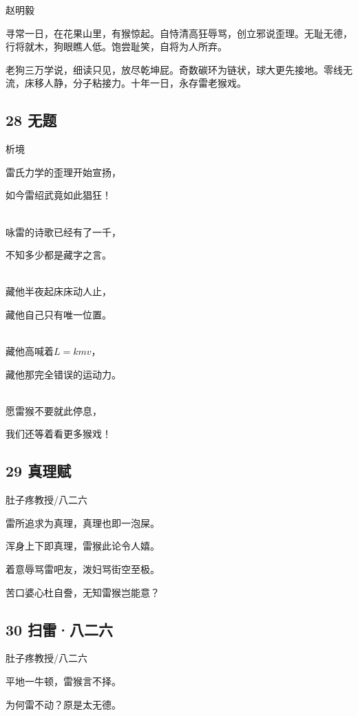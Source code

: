 赵明毅

寻常一日，在花果山里，有猴惊起。自恃清高狂辱骂，创立邪说歪理。无耻无德，行将就木，狗眼瞧人低。饱尝耻笑，自将为人所弃。

老狗三万学说，细读只见，放尽乾坤屁。奇数碳环为链状，球大更先接地。零线无流，床移人静，分子粘接力。十年一日，永存雷老猴戏。

\hypertarget{ux65e0ux9898-6}{%
\subsection{28 无题}\label{ux65e0ux9898-6}}

析境

雷氏力学的歪理开始宣扬，

如今雷绍武竟如此猖狂！

~\\
咏雷的诗歌已经有了一千，

不知多少都是藏字之言。

~\\
藏他半夜起床床动人止，

藏他自己只有唯一位置。

~\\
藏他高喊着\(L=kmv\)，

藏他那完全错误的运动力。

~\\
愿雷猴不要就此停息，

我们还等着看更多猴戏！

\hypertarget{ux771fux7406ux8d4b}{%
\subsection{29 真理赋}\label{ux771fux7406ux8d4b}}

肚子疼教授/八二六

雷所追求为真理，真理也即一泡屎。

浑身上下即真理，雷猴此论令人嬉。

着意辱骂雷吧友，泼妇骂街空至极。

苦口婆心杜自誊，无知雷猴岂能意？

\hypertarget{ux626bux96f7ux516bux4e8cux516d}{%
\subsection{30 扫雷·八二六}\label{ux626bux96f7ux516bux4e8cux516d}}

肚子疼教授/八二六

平地一牛顿，雷猴言不择。

为何雷不动？原是太无德。

